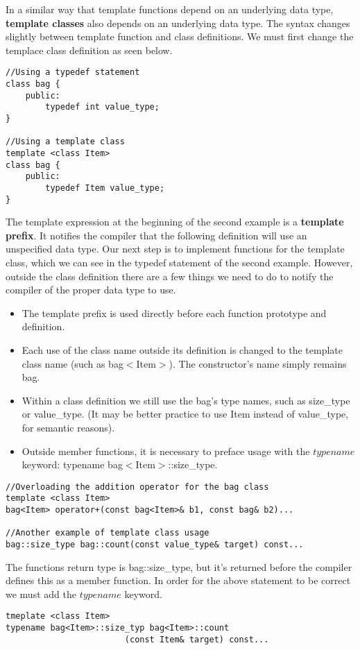 In a similar way that template functions depend on an underlying data type, \textbf{template classes} also depends on an underlying data type.
The syntax changes slightly between template function and class definitions. We must first change the templace class definition as seen below.
\begin{lstlisting}
//Using a typedef statement
class bag {
    public:
        typedef int value_type;
}

//Using a template class
template <class Item>
class bag {
    public:
        typedef Item value_type;
}
\end{lstlisting}
The template expression at the beginning of the second example is a \textbf{template prefix}. It notifies the compiler that the following definition will use an unspecified data type. Our next step is to implement functions for the template class, which we can see in the typedef statement of the second example. However, outside the class definition there are a few things we need to do to notify the compiler of the proper data type to use.
\begin{itemize}
\item The template prefix is used directly before each function prototype and definition.
\item Each use of the class name outside its definition is changed to the template class name (such as bag$<$Item$>$). The constructor's name simply remains bag.
\item Within a class definition we still use the bag's type names, such as size\_type or value\_type. (It may be better practice to use Item instead of value\_type, for semantic reasons).
\item Outside member functions, it is necessary to preface usage with the $typename$ keyword: typename bag$<$Item$>$::size\_type.
\end{itemize}
\begin{lstlisting}
//Overloading the addition operator for the bag class
template <class Item>
bag<Item> operator+(const bag<Item>& b1, const bag& b2)...

//Another example of template class usage
bag::size_type bag::count(const value_type& target) const...
\end{lstlisting}
The functions return type is bag::size\_type, but it's returned before the compiler defines this as a member function. In order for the above statement to be correct we must add the $typename$ keyword.
\begin{lstlisting}
tmeplate <class Item>
typename bag<Item>::size_typ bag<Item>::count 
                        (const Item& target) const...
\end{lstlisting}
